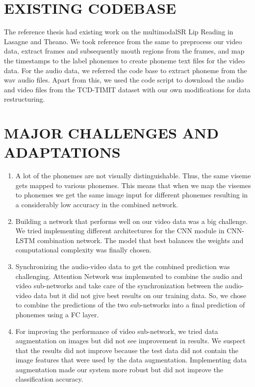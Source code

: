\documentclass{article}
\begin{document}
\section{EXISTING CODEBASE}
The reference thesis \cite{Thesis} had existing work on the multimodalSR Lip Reading in Lasagne and Theano. We took reference from the same to preprocess our video data, extract frames and subsequently mouth regions from the frames, and map the timestamps to the label phonemes to create phoneme text files for the video data. For the audio data, we referred the code base to extract phoneme from the wav audio files. Apart from this, we used the code script to download the audio and video files from the TCD-TIMIT dataset with our own modifications for data restructuring.

\section{MAJOR CHALLENGES AND ADAPTATIONS}
\begin{enumerate}
    \item A lot of the phonemes are not visually distinguishable. Thus, the same viseme gets mapped to various phonemes. This means that when we map the visemes to phonemes we get the same image input for different phonemes resulting in a considerably low accuracy in the combined network.
    \item Building a network that performs well on our video data was a big challenge. We tried implementing different architectures for the CNN module in CNN-LSTM combination network. The model that best balances the weights and computational complexity was finally chosen.
    \item Synchronizing the audio-video data to get the combined prediction was challenging. Attention Network was implemented to combine the audio and video sub-networks and take care of the synchronization between the audio-video data but it did not give best results on our training data. So, we chose to combine the predictions of the two sub-networks into a final prediction of phonemes using a FC layer. 
    \item For improving the performance of video sub-network, we tried data augmentation on images but did not see improvement in results. We suspect that the results did not improve because the test data did not contain the image features that were used by the data augmentation. Implementing data augmentation made our system more robust but did not improve the classification accuracy. 
\end{enumerate}
\end{document}

